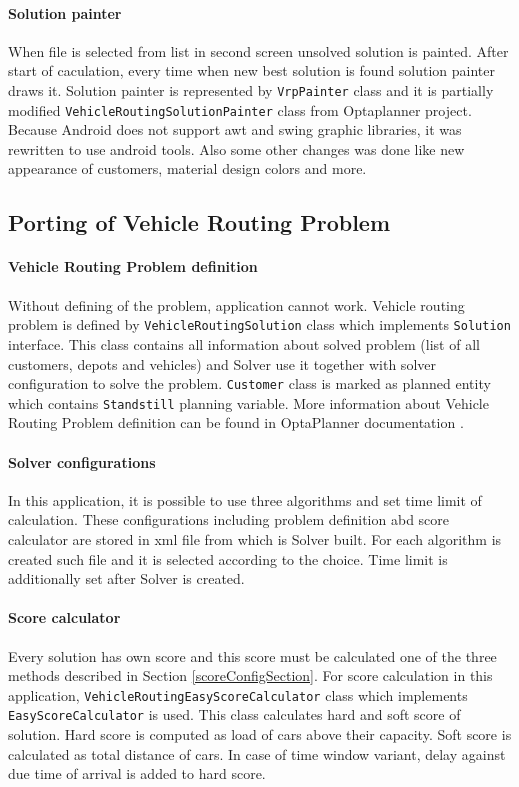 \paragraph{Solution painter}
When file is selected from list in second screen unsolved solution is painted. After start of caculation, every time
when new best solution is found solution painter draws it. Solution painter is represented by \texttt{VrpPainter} class
and it is partially modified \texttt{VehicleRoutingSolutionPainter} class from Optaplanner project. Because Android
does not support awt and swing graphic libraries, it was rewritten to use android tools. Also some other changes was
done like new appearance of customers, material design colors and more.

\subsection{Porting of Vehicle Routing Problem}

\paragraph{Vehicle Routing Problem definition}
Without defining of the problem, application cannot work. Vehicle routing problem is defined by
\texttt{VehicleRoutingSolution} class which implements \texttt{Solution} interface. This class contains all information
about solved problem (list of all customers, depots and vehicles) and Solver use it together with solver configuration
to solve the problem. \texttt{Customer} class is marked as planned entity which contains \texttt{Standstill} planning
variable. More information about Vehicle Routing Problem definition can be found in OptaPlanner documentation
\cite{OptaPlannerDoc}.

\paragraph{Solver configurations}
In this application, it is possible to use three algorithms and set time limit of calculation. These configurations
including problem definition abd score calculator are stored in xml file from which is Solver built. For each algorithm
is created such file and it is selected according to the choice. Time limit is additionally set after Solver is created.

\paragraph{Score calculator}
Every solution has own score and this score must be calculated one of the three methods described in Section
\ref{scoreConfigSection}. For score calculation in this application, \texttt{VehicleRoutingEasyScoreCalculator} class
which implements \texttt{EasyScoreCalculator} is used. This class calculates hard and soft score of solution. Hard score
is computed as load of cars above their capacity. Soft score is calculated as total distance of cars. In case of time
window variant, delay against due time of arrival is added to hard score.

